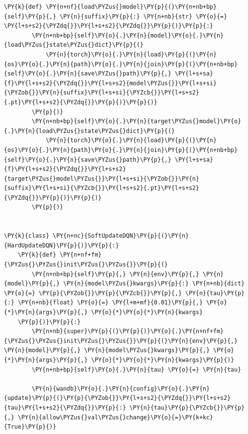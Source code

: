 \documentclass{article}
\begin{document}
\begin{Verbatim}[commandchars=\\\{\}]
    \PY{k}{def} \PY{n+nf}{load\PYZus{}model}\PY{p}{(}\PY{n+nb+bp}{self}\PY{p}{,} \PY{n}{suffix}\PY{p}{:} \PY{n+nb}{str} \PY{o}{=} \PY{l+s+s2}{\PYZdq{}}\PY{l+s+s2}{\PYZdq{}}\PY{p}{)}\PY{p}{:}
        \PY{n+nb+bp}{self}\PY{o}{.}\PY{n}{model}\PY{o}{.}\PY{n}{load\PYZus{}state\PYZus{}dict}\PY{p}{(}
            \PY{n}{torch}\PY{o}{.}\PY{n}{load}\PY{p}{(}\PY{n}{os}\PY{o}{.}\PY{n}{path}\PY{o}{.}\PY{n}{join}\PY{p}{(}\PY{n+nb+bp}{self}\PY{o}{.}\PY{n}{save\PYZus{}path}\PY{p}{,} \PY{l+s+sa}{f}\PY{l+s+s2}{\PYZdq{}}\PY{l+s+s2}{model\PYZus{}}\PY{l+s+si}{\PYZob{}}\PY{n}{suffix}\PY{l+s+si}{\PYZcb{}}\PY{l+s+s2}{.pt}\PY{l+s+s2}{\PYZdq{}}\PY{p}{)}\PY{p}{)}
        \PY{p}{)}
        \PY{n+nb+bp}{self}\PY{o}{.}\PY{n}{target\PYZus{}model}\PY{o}{.}\PY{n}{load\PYZus{}state\PYZus{}dict}\PY{p}{(}
            \PY{n}{torch}\PY{o}{.}\PY{n}{load}\PY{p}{(}\PY{n}{os}\PY{o}{.}\PY{n}{path}\PY{o}{.}\PY{n}{join}\PY{p}{(}\PY{n+nb+bp}{self}\PY{o}{.}\PY{n}{save\PYZus{}path}\PY{p}{,} \PY{l+s+sa}{f}\PY{l+s+s2}{\PYZdq{}}\PY{l+s+s2}{target\PYZus{}model\PYZus{}}\PY{l+s+si}{\PYZob{}}\PY{n}{suffix}\PY{l+s+si}{\PYZcb{}}\PY{l+s+s2}{.pt}\PY{l+s+s2}{\PYZdq{}}\PY{p}{)}\PY{p}{)}
        \PY{p}{)}


\PY{k}{class} \PY{n+nc}{SoftUpdateDQN}\PY{p}{(}\PY{n}{HardUpdateDQN}\PY{p}{)}\PY{p}{:}
    \PY{k}{def} \PY{n+nf+fm}{\PYZus{}\PYZus{}init\PYZus{}\PYZus{}}\PY{p}{(}
        \PY{n+nb+bp}{self}\PY{p}{,} \PY{n}{env}\PY{p}{,} \PY{n}{model}\PY{p}{,} \PY{n}{model\PYZus{}kwargs}\PY{p}{:} \PY{n+nb}{dict} \PY{o}{=} \PY{p}{\PYZob{}}\PY{p}{\PYZcb{}}\PY{p}{,} \PY{n}{tau}\PY{p}{:} \PY{n+nb}{float} \PY{o}{=} \PY{l+m+mf}{0.01}\PY{p}{,} \PY{o}{*}\PY{n}{args}\PY{p}{,} \PY{o}{*}\PY{o}{*}\PY{n}{kwargs}
    \PY{p}{)}\PY{p}{:}
        \PY{n+nb}{super}\PY{p}{(}\PY{p}{)}\PY{o}{.}\PY{n+nf+fm}{\PYZus{}\PYZus{}init\PYZus{}\PYZus{}}\PY{p}{(}\PY{n}{env}\PY{p}{,} \PY{n}{model}\PY{p}{,} \PY{n}{model\PYZus{}kwargs}\PY{p}{,} \PY{o}{*}\PY{n}{args}\PY{p}{,} \PY{o}{*}\PY{o}{*}\PY{n}{kwargs}\PY{p}{)}
        \PY{n+nb+bp}{self}\PY{o}{.}\PY{n}{tau} \PY{o}{=} \PY{n}{tau}

        \PY{n}{wandb}\PY{o}{.}\PY{n}{config}\PY{o}{.}\PY{n}{update}\PY{p}{(}\PY{p}{\PYZob{}}\PY{l+s+s2}{\PYZdq{}}\PY{l+s+s2}{tau}\PY{l+s+s2}{\PYZdq{}}\PY{p}{:} \PY{n}{tau}\PY{p}{\PYZcb{}}\PY{p}{,} \PY{n}{allow\PYZus{}val\PYZus{}change}\PY{o}{=}\PY{k+kc}{True}\PY{p}{)}


\end{Verbatim}
\end{document}
